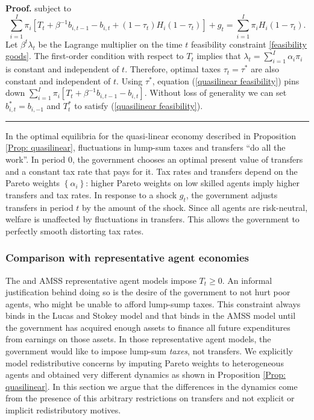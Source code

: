 \documentclass[thmsb,11pt]{article}
\newenvironment{proof}[1][Proof]{\noindent \textbf{#1.} }{\  \rule{0.5em}{0.5em}}
\begin{document}
\begin{proof}
subject to
\begin{equation}
\sum_{i=1}^{I}\pi _{i}\left[ T_{t}+\beta ^{-1}b_{i,t-1}-b_{i,t}+\left(
1-\tau _{t}\right) H_{i}\left( 1-\tau _{t}\right) \right] +g_{t}=%
\sum_{i=1}^{I}\pi _{i}H_{i}\left( 1-\tau _{t}\right) .
\label{quasilinear feasibility}
\end{equation}%
Let $\beta ^{t}\lambda _{t}$ be the Lagrange multiplier on the time $t$
feasibility constraint \eqref{feasibility goods}. The first-order condition with respect to $T_{t}$
implies that $\lambda _{t}=\sum_{i=1}^{I}\alpha _{i}\pi _{i}$ is constant
and independent of $t.$ Therefore, optimal taxes $\tau _{t}=\tau^{\ast }$ are
also constant and independent of $t.$  Using $\tau^{\ast}$, equation (\ref{quasilinear feasibility}) pins down $\sum_{i=1}^{I}\pi _{i}\left[ T_{t}+\beta ^{-1}b_{i,t-1}-b_{i,t}\right]$. Without loss of generality we can set $b^*_{i,t}=b_{i,-1}$ and $T^*_t$ to satisfy  (\ref{quasilinear feasibility}). %
\end{proof}

\smallskip In the optimal equilibria for the quasi-linear economy described in Proposition \ref{Prop: quasilinear}, fluctuations in lump-sum taxes and
transfers ``do all the work''. In period 0, the government chooses an optimal
present value of transfers and a constant tax rate that pays for it. Tax rates  and transfers depend on the Pareto weights $\left\{ \alpha
_{i}\right\} $:  higher Pareto weights on low skilled agents imply
higher transfers and tax rates. In response to a shock $g_{t}$, the
government adjusts transfers in period $t$ by the amount of the shock. Since
all agents are risk-neutral,  welfare is unaffected by
fluctuations in transfers. This allows the government  to  perfectly smooth distorting tax rates.

\smallskip

\subsubsection{Comparison with representative agent economies} \label{sec: comp with AMSS}

The \cite{LucasJr.1983} and AMSS representative agent models
impose $T_{t}\geq 0$. An informal justification behind doing so is the desire of the government to not hurt poor agents, who might be unable to afford lump-sump taxes.  This constraint always binds in the Lucas and Stokey
model and that binds in the AMSS model  until the government has acquired enough
assets to finance all future expenditures from earnings on those assets. In those
representative agent models, the government would like to impose lump-sum \emph{taxes}, not
transfers. We explicitly model redistributive concerns by imputing Pareto weights to heterogeneous agents and obtained very different dynamics as shown in Proposition \ref{Prop: quasilinear}. In this section we argue that the differences in the dynamics come from the presence of this arbitrary restrictions on transfers and not explicit or implicit redistributory motives. 
\end{document}
